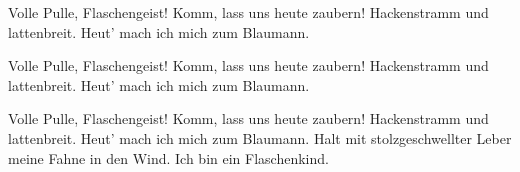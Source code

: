 \begin{guitar}
	\begin{highlightbar}
		 
		Volle Pulle, Flaschengeist! Komm, lass uns heute zaubern!
		Hackenstramm und lattenbreit. Heut' mach ich mich zum Blaumann.
		
		Volle Pulle, Flaschengeist! Komm, lass uns heute zaubern!
		Hackenstramm und lattenbreit. Heut' mach ich mich zum Blaumann.
		
		Volle Pulle, Flaschengeist! Komm, lass uns heute zaubern!
		Hackenstramm und lattenbreit. Heut' mach ich mich zum Blaumann.
		Halt mit stolzgeschwellter Leber meine Fahne in den Wind.
		Ich bin ein Flaschenkind.
	\end{highlightbar}
\end{guitar}